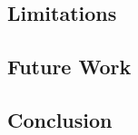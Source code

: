\documentclass[english]{tktltiki2}
\theoremstyle{definition}
\theoremstyle{remark}
\begin{document}
\subsection{Limitations} %
\subsection{Future Work} %
\subsection{Conclusion} %

%
%




% 



\end{document}
